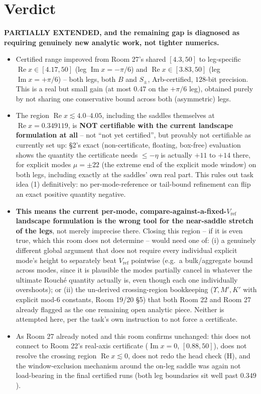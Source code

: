 \documentclass[11pt]{article}
\begin{document}
\section*{Verdict}
\textbf{PARTIALLY EXTENDED, and the remaining gap is diagnosed as requiring genuinely new analytic work,
not tighter numerics.}
\begin{itemize}
\item Certified range improved from Room 27's shared $[4.3,50]$ to leg-specific
$\operatorname{Re}x\in[4.17,50]$ (leg $\operatorname{Im}x=-\pi/6$) and $\operatorname{Re}x\in[3.83,50]$
(leg $\operatorname{Im}x=+\pi/6$) -- both legs, both $B$ and $S_\pm$, Arb-certified, $128$-bit precision.
This is a real but small gain (at most $0.47$ on the $+\pi/6$ leg), obtained purely by not sharing one
conservative bound across both (asymmetric) legs.
\item The region $\operatorname{Re}x\lesssim4.0$--$4.05$, including the saddles themselves at
$\operatorname{Re}x=0.349119$, is \textbf{NOT certifiable with the current landscape formulation at all}
-- not ``not yet certified'', but provably not certifiable as currently set up: \S2's exact
(non-certificate, floating, box-free) evaluation shows the quantity the certificate needs
$\le-\eta$ is actually $+11$ to $+14$ there, for explicit modes $\mu=\pm22$ (the extreme end of the
explicit mode window) on both legs, including exactly at the saddles' own real part. This rules out task
idea (1) definitively: no per-mode-reference or tail-bound refinement can flip an exact positive quantity
negative.
\item \textbf{This means the current per-mode, compare-against-a-fixed-$V_{\mathrm{ref}}$ landscape
formulation is the wrong tool for the near-saddle stretch of the legs}, not merely imprecise there. Closing
this region -- if it is even true, which this room does not determine -- would need one of: (i) a genuinely
different global argument that does not require every individual explicit mode's height to separately beat
$V_{\mathrm{ref}}$ pointwise (e.g.\ a bulk/aggregate bound across modes, since it is plausible the modes
partially cancel in whatever the ultimate Rouch\'e quantity actually is, even though each one individually
overshoots); or (ii) the un-derived crossing-region bookkeeping ($\Upsilon,M',K'$ with explicit mod-6
constants, Room 19/20 \S5) that both Room 22 and Room 27 already flagged as the one remaining open
analytic piece. Neither is attempted here, per the task's own instruction to not force a certificate.
\item As Room 27 already noted and this room confirms unchanged: this does not connect to Room 22's
real-axis certificate ($\operatorname{Im}x=0$, $[0.88,50]$), does not resolve the crossing region
$\operatorname{Re}x\lesssim0$, does not redo the head check (H), and the window-exclusion mechanism
around the on-leg saddle was again not load-bearing in the final certified runs (both leg boundaries sit
well past $0.349$).
\end{itemize}
\end{document}
